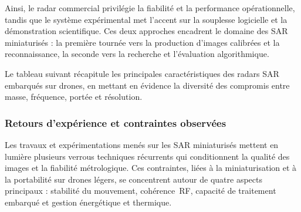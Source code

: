 Ainsi, le radar commercial privilégie la fiabilité et la performance opérationnelle, tandis que le système expérimental met l’accent sur la souplesse logicielle et la démonstration scientifique. Ces deux approches encadrent le domaine des SAR miniaturisés : la première tournée vers la production d’images calibrées et la reconnaissance, la seconde vers la recherche et l’évaluation algorithmique.

\vspace{1em}

Le tableau suivant récapitule les principales caractéristiques des radars SAR embarqués sur drones, en mettant en évidence la diversité des compromis entre masse, fréquence, portée et résolution.

\begin{table}[h!]
\centering
\label{tab:radars_sar}
\caption{Comparatif de différents radars SAR embarqués sur drones.}
\end{table}

\subsubsection{Retours d’expérience et contraintes observées}

Les travaux et expérimentations menés sur les SAR miniaturisés mettent en lumière plusieurs verrous techniques récurrents qui conditionnent la qualité des images et la fiabilité métrologique. Ces contraintes, liées à la miniaturisation et à la portabilité sur drones légers, se concentrent autour de quatre aspects principaux : stabilité du mouvement, cohérence~RF, capacité de traitement embarqué et gestion énergétique et thermique.

